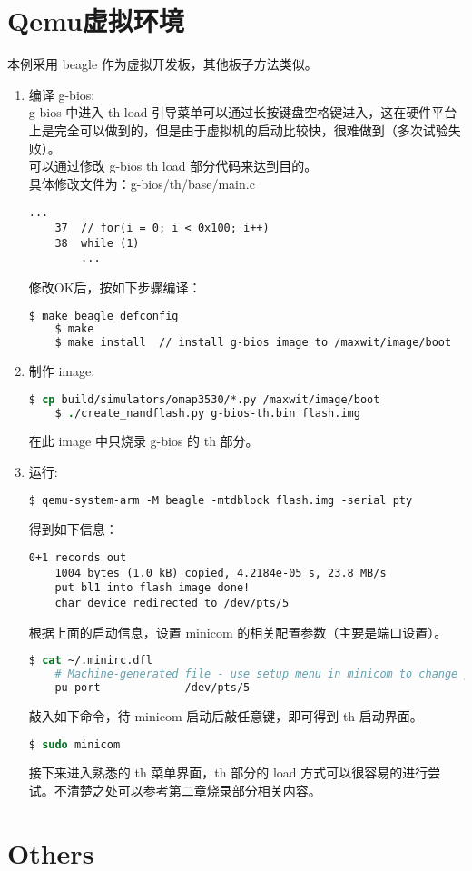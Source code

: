 \section{Qemu虚拟环境}
本例采用 beagle 作为虚拟开发板，其他板子方法类似。
\begin{enumerate}
	\item 编译 g-bios: \\
	g-bios 中进入 th load 引导菜单可以通过长按键盘空格键进入，这在硬件平台上是完全可以做到的，但是由于虚拟机的启动比较快，很难做到（多次试验失败）。\\
	可以通过修改 g-bios th load 部分代码来达到目的。\\
	具体修改文件为：g-bios/th/base/main.c
	\lstset{language=[ANSI]C}
	\begin{lstlisting}[numbers=none]
		...
	37	// for(i = 0; i < 0x100; i++)
	38	while (1)
		...
	\end{lstlisting}
	修改OK后，按如下步骤编译：
	\begin{lstlisting}[language=sh,numbers=none]
	$ make beagle_defconfig
	$ make
	$ make install  // install g-bios image to /maxwit/image/boot
	\end{lstlisting}

	\item 制作 image:
	\begin{lstlisting}[language=csh,numbers=none]
	$ cp build/simulators/omap3530/*.py /maxwit/image/boot
	$ ./create_nandflash.py g-bios-th.bin flash.img
	\end{lstlisting}
	在此 image 中只烧录 g-bios 的 th 部分。

	\item 运行:
	\begin{lstlisting}[language=csh,numbers=none]
	$ qemu-system-arm -M beagle -mtdblock flash.img -serial pty
	\end{lstlisting}
	得到如下信息：
	\begin{lstlisting}[numbers=none]
	0+1 records out
	1004 bytes (1.0 kB) copied, 4.2184e-05 s, 23.8 MB/s
	put bl1 into flash image done!
	char device redirected to /dev/pts/5
	\end{lstlisting}
	根据上面的启动信息，设置 minicom 的相关配置参数（主要是端口设置）。
	\begin{lstlisting}[language=csh,numbers=none]
	$ cat ~/.minirc.dfl
	# Machine-generated file - use setup menu in minicom to change parameters.
	pu port             /dev/pts/5
	\end{lstlisting}
	敲入如下命令，待 minicom 启动后敲任意键，即可得到 th 启动界面。
	\begin{lstlisting}[language=csh,numbers=none]
	$ sudo minicom
	\end{lstlisting}
	接下来进入熟悉的 th 菜单界面，th 部分的 load 方式可以很容易的进行尝试。不清楚之处可以参考第二章烧录部分相关内容。

\end{enumerate}

\section{Others}
